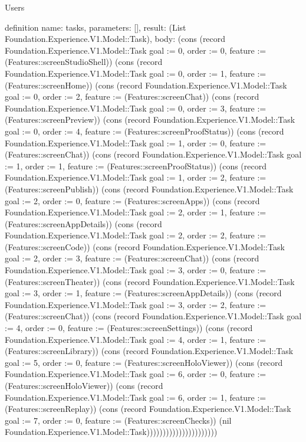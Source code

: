 \begin{lexlean}{Users}
\begin{semanticmodule}
definition{
  name: tasks,
  parameters: [],
  result: (List Foundation.Experience.V1.Model::Task),
  body: (cons (record Foundation.Experience.V1.Model::Task {goal := 0, order := 0, feature := (Features::screenStudioShell)}) (cons (record Foundation.Experience.V1.Model::Task {goal := 0, order := 1, feature := (Features::screenHome)}) (cons (record Foundation.Experience.V1.Model::Task {goal := 0, order := 2, feature := (Features::screenChat)}) (cons (record Foundation.Experience.V1.Model::Task {goal := 0, order := 3, feature := (Features::screenPreview)}) (cons (record Foundation.Experience.V1.Model::Task {goal := 0, order := 4, feature := (Features::screenProofStatus)}) (cons (record Foundation.Experience.V1.Model::Task {goal := 1, order := 0, feature := (Features::screenChat)}) (cons (record Foundation.Experience.V1.Model::Task {goal := 1, order := 1, feature := (Features::screenProofStatus)}) (cons (record Foundation.Experience.V1.Model::Task {goal := 1, order := 2, feature := (Features::screenPublish)}) (cons (record Foundation.Experience.V1.Model::Task {goal := 2, order := 0, feature := (Features::screenApps)}) (cons (record Foundation.Experience.V1.Model::Task {goal := 2, order := 1, feature := (Features::screenAppDetails)}) (cons (record Foundation.Experience.V1.Model::Task {goal := 2, order := 2, feature := (Features::screenCode)}) (cons (record Foundation.Experience.V1.Model::Task {goal := 2, order := 3, feature := (Features::screenChat)}) (cons (record Foundation.Experience.V1.Model::Task {goal := 3, order := 0, feature := (Features::screenTheater)}) (cons (record Foundation.Experience.V1.Model::Task {goal := 3, order := 1, feature := (Features::screenAppDetails)}) (cons (record Foundation.Experience.V1.Model::Task {goal := 3, order := 2, feature := (Features::screenChat)}) (cons (record Foundation.Experience.V1.Model::Task {goal := 4, order := 0, feature := (Features::screenSettings)}) (cons (record Foundation.Experience.V1.Model::Task {goal := 4, order := 1, feature := (Features::screenLibrary)}) (cons (record Foundation.Experience.V1.Model::Task {goal := 5, order := 0, feature := (Features::screenHoloViewer)}) (cons (record Foundation.Experience.V1.Model::Task {goal := 6, order := 0, feature := (Features::screenHoloViewer)}) (cons (record Foundation.Experience.V1.Model::Task {goal := 6, order := 1, feature := (Features::screenReplay)}) (cons (record Foundation.Experience.V1.Model::Task {goal := 7, order := 0, feature := (Features::screenChecks)}) (nil Foundation.Experience.V1.Model::Task))))))))))))))))))))))
}


\end{semanticmodule}
\end{lexlean}
